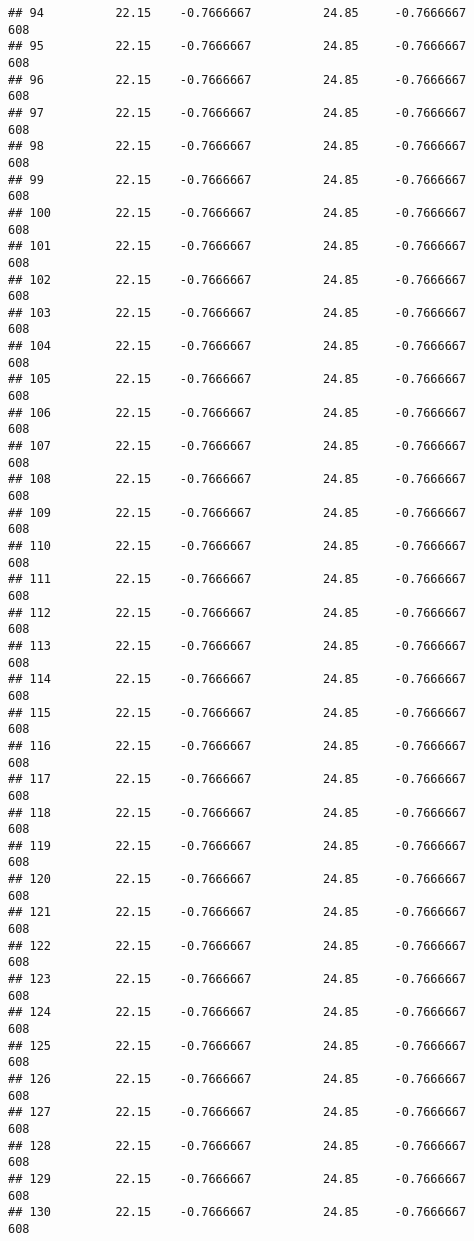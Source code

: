 \documentclass[]{article}
\begin{document}
\begin{verbatim}
## 94          22.15    -0.7666667          24.85     -0.7666667    608
## 95          22.15    -0.7666667          24.85     -0.7666667    608
## 96          22.15    -0.7666667          24.85     -0.7666667    608
## 97          22.15    -0.7666667          24.85     -0.7666667    608
## 98          22.15    -0.7666667          24.85     -0.7666667    608
## 99          22.15    -0.7666667          24.85     -0.7666667    608
## 100         22.15    -0.7666667          24.85     -0.7666667    608
## 101         22.15    -0.7666667          24.85     -0.7666667    608
## 102         22.15    -0.7666667          24.85     -0.7666667    608
## 103         22.15    -0.7666667          24.85     -0.7666667    608
## 104         22.15    -0.7666667          24.85     -0.7666667    608
## 105         22.15    -0.7666667          24.85     -0.7666667    608
## 106         22.15    -0.7666667          24.85     -0.7666667    608
## 107         22.15    -0.7666667          24.85     -0.7666667    608
## 108         22.15    -0.7666667          24.85     -0.7666667    608
## 109         22.15    -0.7666667          24.85     -0.7666667    608
## 110         22.15    -0.7666667          24.85     -0.7666667    608
## 111         22.15    -0.7666667          24.85     -0.7666667    608
## 112         22.15    -0.7666667          24.85     -0.7666667    608
## 113         22.15    -0.7666667          24.85     -0.7666667    608
## 114         22.15    -0.7666667          24.85     -0.7666667    608
## 115         22.15    -0.7666667          24.85     -0.7666667    608
## 116         22.15    -0.7666667          24.85     -0.7666667    608
## 117         22.15    -0.7666667          24.85     -0.7666667    608
## 118         22.15    -0.7666667          24.85     -0.7666667    608
## 119         22.15    -0.7666667          24.85     -0.7666667    608
## 120         22.15    -0.7666667          24.85     -0.7666667    608
## 121         22.15    -0.7666667          24.85     -0.7666667    608
## 122         22.15    -0.7666667          24.85     -0.7666667    608
## 123         22.15    -0.7666667          24.85     -0.7666667    608
## 124         22.15    -0.7666667          24.85     -0.7666667    608
## 125         22.15    -0.7666667          24.85     -0.7666667    608
## 126         22.15    -0.7666667          24.85     -0.7666667    608
## 127         22.15    -0.7666667          24.85     -0.7666667    608
## 128         22.15    -0.7666667          24.85     -0.7666667    608
## 129         22.15    -0.7666667          24.85     -0.7666667    608
## 130         22.15    -0.7666667          24.85     -0.7666667    608

\end{verbatim}
\end{document}
